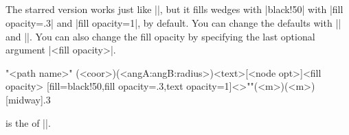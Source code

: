 \subsection{\protect{}}
\label{ss:tzwedge*}

The starred version \icmd{\tzwedge*} works just like |\tzwedge|, but it fills wedges with |black!50| with |fill opacity=.3| and |fill opacity=1|, by default.
You can change the defaults with |\settzfillcolor| and |\settzfillopacity|.
You can also change the fill opacity by specifying the last optional argument |{<fill opacity>}|.

\begin{tzdef}{}
"<path name>"
         (<coor>)(<angA:angB:radius>){<text>}[<node opt>]{<fill opacity>}
  [fill=black!50,fill opacity=.3,text opacity=1]<>""(<m>)(<m>){}[midway]{.3}
\end{tzdef}

 is the  of |\tzwedge*|.

\begin{tzcode}{.3}
\end{tzcode}

\begin{tzcode}{.3}
\end{tzcode}


